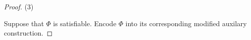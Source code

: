\begin{proof}
\noindent (3) 








Suppose that $\Phi$ is satisfiable.  
Encode $\Phi$ into its corresponding modified auxilary construction.








\end{proof}
